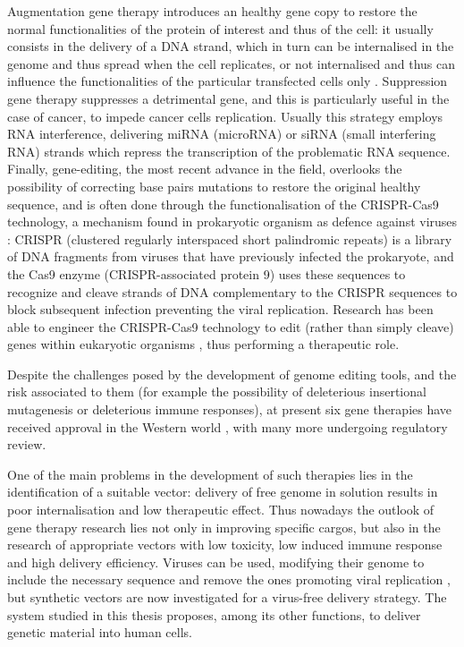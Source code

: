 Augmentation gene therapy introduces an healthy gene copy to restore the normal functionalities of the protein of interest and thus of the cell: it usually consists in the delivery of a DNA strand, which in turn can be internalised in the genome and thus spread when the cell replicates, or not internalised and thus can influence the functionalities of the particular transfected cells only \citep{Anguela2019}.
%
Suppression gene therapy suppresses a detrimental gene, and this is particularly useful in the case of cancer, to impede cancer cells replication. Usually this strategy employs RNA interference, delivering miRNA (microRNA) or siRNA (small interfering RNA) strands which repress the transcription of the problematic RNA sequence.
%
Finally, gene-editing, the most recent advance in the field, overlooks the possibility of correcting base pairs mutations to restore the original healthy sequence, and is often done through the functionalisation of the CRISPR-Cas9 technology, a mechanism found in prokaryotic organism as defence against viruses \citep{Barrangou2015}:
%
CRISPR (clustered regularly interspaced short palindromic repeats) is a library of DNA fragments from viruses that have previously infected the prokaryote, and the Cas9 enzyme (CRISPR-associated protein 9) uses these sequences to recognize and cleave strands of DNA complementary to the CRISPR sequences to block subsequent infection preventing the viral replication. Research has been able to engineer the CRISPR-Cas9 technology to edit (rather than simply cleave) genes within eukaryotic organisms \citep{Zhang2014cas}, thus performing a therapeutic role.

Despite the challenges posed by the development of genome editing tools, and the risk associated to them (for example the possibility of deleterious insertional mutagenesis or deleterious immune responses), at present six gene therapies have received approval in the Western world \citep{Anguela2019}, with many more undergoing regulatory review. 

One of the main problems in the development of such therapies lies in the identification of a suitable vector: delivery of free genome in solution results in poor internalisation and low therapeutic effect.
%
Thus nowadays the outlook of gene therapy research lies not only in improving specific cargos, but also in the research of appropriate vectors with low toxicity, low induced immune response and high delivery efficiency. Viruses can be used, modifying their genome to include the necessary sequence and remove the ones promoting viral replication \citep{Naldini2011,Mingozzi2011}, but synthetic vectors are now investigated for a virus-free delivery strategy. The system studied in this thesis proposes, among its other functions, to deliver genetic material into human cells.


